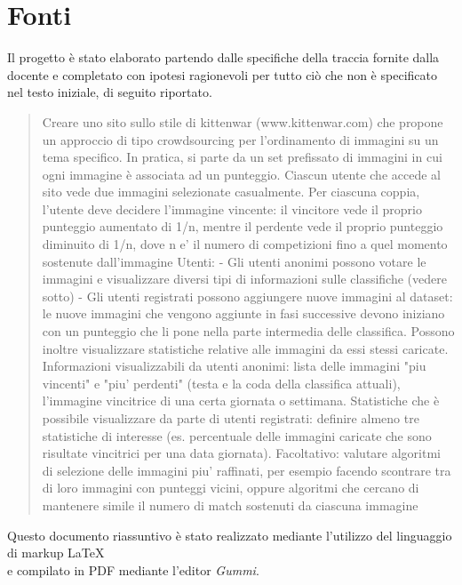 \documentclass{scrreprt}
\begin{document}
\section{Fonti}
Il progetto è stato elaborato partendo dalle specifiche della traccia fornite dalla docente e completato con ipotesi ragionevoli per tutto ciò che non è specificato nel testo iniziale, di seguito riportato.
\begin{quote}
Creare uno sito sullo stile di kittenwar (www.kittenwar.com) che propone un approccio di tipo
crowdsourcing per l'ordinamento di immagini su un tema specifico.
In pratica, si parte da un set prefissato di immagini in cui ogni immagine è associata ad un
punteggio. Ciascun utente che accede al sito vede due immagini selezionate casualmente. Per
ciascuna coppia, l'utente deve decidere l'immagine vincente: il vincitore vede il proprio punteggio
aumentato di 1/n, mentre il perdente vede il proprio punteggio diminuito di 1/n, dove n e' il numero
di competizioni fino a quel momento sostenute dall'immagine
Utenti:
- Gli utenti anonimi possono votare le immagini e visualizzare diversi tipi di informazioni sulle
classifiche (vedere sotto)
- Gli utenti registrati possono aggiungere nuove immagini al dataset: le nuove immagini che
vengono aggiunte in fasi successive devono iniziano con un punteggio che li pone nella parte
intermedia delle classifica. Possono inoltre visualizzare statistiche relative alle immagini da essi
stessi caricate.
Informazioni visualizzabili da utenti anonimi: lista delle immagini "piu vincenti" e "piu' perdenti"
(testa e la coda della
 classifica attuali), l'immagine vincitrice di una certa giornata o settimana.
Statistiche che è possibile visualizzare da parte di utenti registrati: definire almeno tre statistiche di
interesse (es. percentuale delle immagini caricate che sono risultate vincitrici per una data giornata).
Facoltativo: valutare algoritmi di selezione delle immagini piu' raffinati, per esempio facendo
scontrare tra di loro immagini con punteggi vicini, oppure algoritmi che cercano di mantenere
simile il numero di match sostenuti da ciascuna immagine
\end{quote}
Questo documento riassuntivo è stato realizzato mediante l'utilizzo del linguaggio di markup \LaTeX\\ e compilato in PDF mediante l'editor \textit{Gummi}.

\end{document}
